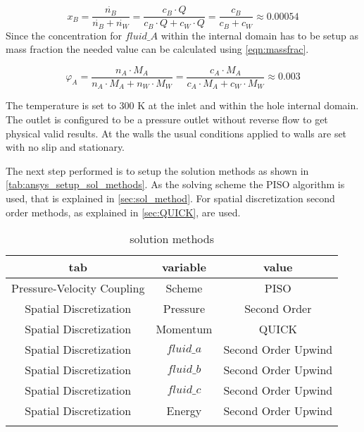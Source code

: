 \documentclass[../thesis.tex]{subfiles}
\begin{document}
\begin{equation}
	\label{eqn:molefrac}
	x_{B} =\dfrac{\dot{n_{B}}}{\dot{n_{B}} + \dot{n_{W}}} = \dfrac{c_{B} \cdot Q}{c_{B} \cdot Q + c_{W} \cdot Q} = \dfrac{c_{B}}{c_{B} + c_{W}} \approx 0 \text{.}00054
\end{equation}
Since the concentration for $fluid\_{A}$ within the internal domain has to be setup as mass fraction the needed value can be calculated using \autoref{eqn:massfrac}.

\begin{equation}
	\label{eqn:massfrac}
	\varphi_{A} =\dfrac{n_{A} \cdot M_{A}}{n_{A} \cdot M_{A} + n_{W} \cdot M_{W}} = \dfrac{c_{A} \cdot M_{A}}{c_{A} \cdot M_{A} + c_{W} \cdot M_{W}} \approx \text{0.003}
\end{equation}

The temperature is set to 300 K at the inlet and within the hole internal domain. The outlet is configured to be a pressure outlet without reverse flow to get physical valid results. At the walls the usual conditions applied to walls are set with no slip and stationary.

The next step performed is to setup the solution methods as shown in \autoref{tab:ansys_setup_sol_methods}. As the solving scheme the PISO algorithm is used, that is explained in \autoref{sec:sol_method}. For spatial discretization second order methods, as explained in \autoref{sec:QUICK}, are used. 
\begin{table} [htb]
	\centering
	\caption{solution methods}
	\begin{tabular}{ ccc }
		\hline
		tab & variable & value \\
		\hline
		Pressure-Velocity Coupling & Scheme & PISO \\
		Spatial Discretization & Pressure & Second Order \\
		Spatial Discretization & Momentum & QUICK \\
		Spatial Discretization & $fluid\_a$ & Second Order Upwind \\
		Spatial Discretization & $fluid\_b$ & Second Order Upwind \\
		Spatial Discretization & $fluid\_c$ & Second Order Upwind \\
		Spatial Discretization & Energy & Second Order Upwind \\
		\hline		
		\label{tab:ansys_setup_sol_methods}
	\end{tabular}
\end{table}
\end{document}
